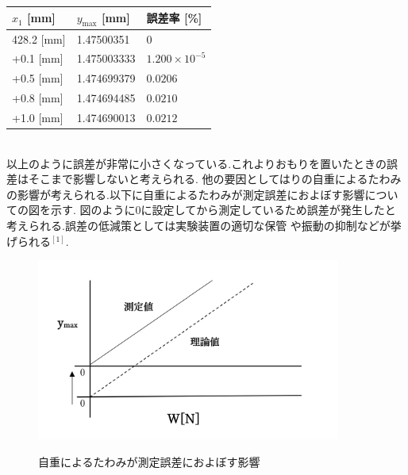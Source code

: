 \documentclass[a4paper,11pt]{jsarticle}
\begin{document}
\begin{enumerate}
\begin{table}[h]
          \begin{tabular}{|p{3cm}|p{3cm}|p{4cm}|}
            \hline
            $x_1$ [mm] & $y_{\text{max}}$ [mm] & 誤差率 [\%]            \\\hline
            428.2 [mm] & 1.47500351            & 0                      \\\hline
            +0.1 [mm]  & 1.475003333           & $1.200 \times 10^{-5}$ \\\hline
            +0.5 [mm]  & 1.474699379           & $0.0206$               \\\hline
            +0.8 [mm]  & 1.474694485           & $0.0210$               \\\hline
            +1.0 [mm]  & 1.474690013           & $0.0212 $              \\\hline
          \end{tabular}
        \end{table}\\
        以上のように誤差が非常に小さくなっている.これよりおもりを置いたときの誤差はそこまで影響しないと考えられる.
        他の要因としてはりの自重によるたわみの影響が考えられる.以下に自重によるたわみが測定誤差におよぼす影響についての図を示す.
        図のように0に設定してから測定しているため誤差が発生したと考えられる.誤差の低減策としては実験装置の適切な保管
        や振動の抑制などが挙げられる$^{[1]}$.
        \clearpage
        \begin{figure}[h]
          \centering
          {\includegraphics[width=10cm]{9.jpg}}
          \caption{自重によるたわみが測定誤差におよぼす影響}
        \end{figure}




\end{enumerate}
\end{document}
